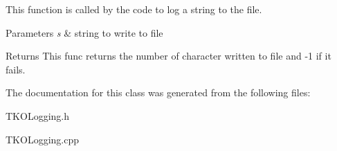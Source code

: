 This function is called by the code to log a string to the file. 


\begin{DoxyParams}{Parameters}
{\em s} & string to write to file \\
\hline
\end{DoxyParams}
\begin{DoxyReturn}{Returns}
This func returns the number of character written to file and -\/1 if it fails. 
\end{DoxyReturn}


The documentation for this class was generated from the following files\-:\begin{DoxyCompactItemize}
\item 
T\-K\-O\-Logging.\-h\item 
T\-K\-O\-Logging.\-cpp\end{DoxyCompactItemize}
